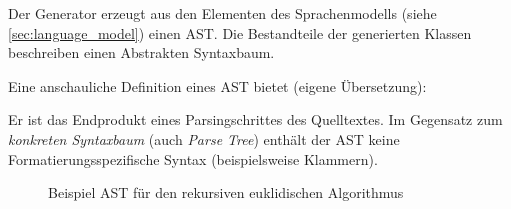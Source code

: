 Der Generator erzeugt aus den Elementen des Sprachenmodells (siehe \cref{sec:language_model}) einen \gls{AST}. 
Die Bestandteile der generierten Klassen beschreiben einen Abstrakten Syntaxbaum.

Eine anschauliche Definition eines \gls{AST} bietet \cite[][S. 69]{ahoCompiler} (eigene Übersetzung):


Er ist das Endprodukt eines Parsingschrittes des Quelltextes. Im Gegensatz zum \emph{konkreten Syntaxbaum} (auch \emph{Parse Tree}) enthält der \gls{AST} keine Formatierungsspezifische Syntax (beispielsweise Klammern). 

\begin{figure}
    \centering
        \centering
    \caption{Beispiel \gls{AST} für den rekursiven euklidischen Algorithmus}
    \label{fig:ast}   
\end{figure}

